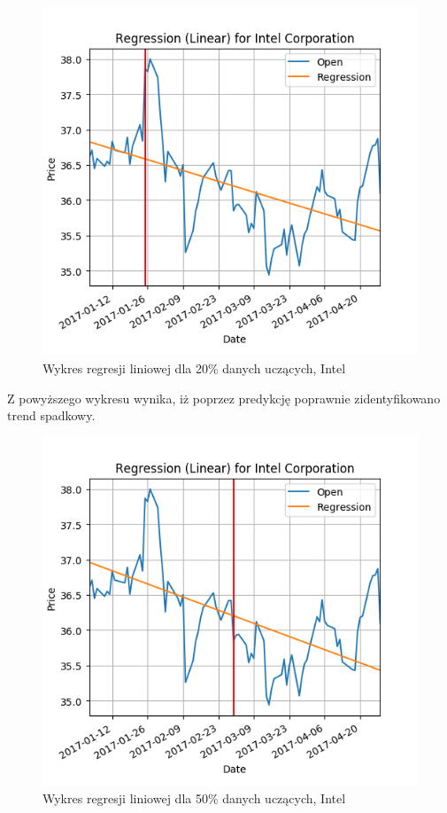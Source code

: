 \begin{figure}[ht]
\centering
\includegraphics[scale=0.4]{pictures/plots/intel_linear_20.png}
\caption{Wykres regresji liniowej dla 20\% danych uczących, Intel}
\label{fig:intel_linear_20}
\end{figure}

Z powyższego wykresu wynika, iż poprzez predykcję poprawnie zidentyfikowano trend spadkowy.\\

\begin{figure}[ht]
\centering
\includegraphics[scale=0.4]{pictures/plots/intel_linear_50.png}
\caption{Wykres regresji liniowej dla 50\% danych uczących, Intel}
\label{fig:intel_linear_50}
\end{figure}

